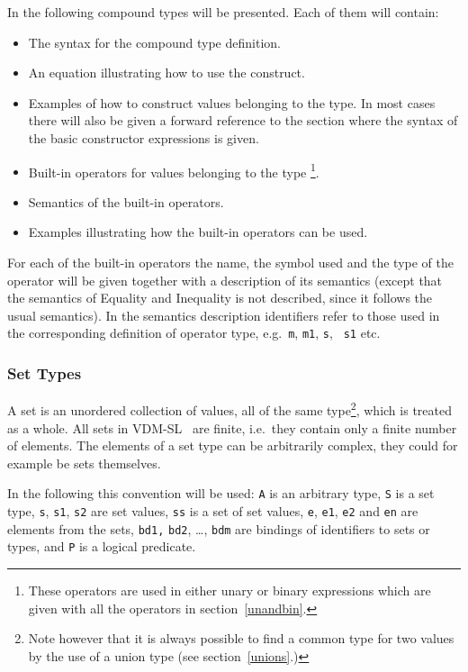 \documentclass[\pformat,12pt]{article}
\newcommand{\vdmslpp}[2]{%
#1
}
\newcommand{\vdmsl}{VDM-SL}
\newcommand{\vdmpp}{VDM++}
\begin{document}
In the following compound types will be presented. Each of
them will contain:
\begin{itemize}
\item The syntax for the compound type definition.
\item An equation illustrating how to use the construct.
\item Examples of how to construct values belonging to the type. In
  most cases there will also be given a forward reference to the
  section where the syntax of the basic constructor expressions is given.
\item Built-in operators for values belonging to the
  type \footnote{These operators are used in either unary or binary
    expressions which are given with all the operators in
    section~\ref{unandbin}.}.
\item Semantics of the built-in operators.
\item Examples illustrating how the built-in operators can be used.
\end{itemize}
For each of the built-in operators the name, the symbol used and the
type of the operator will be given together with a description of its
semantics (except that the semantics of Equality and Inequality is not
described, since it follows the usual semantics). In the semantics
description identifiers refer to those used in the corresponding
definition of operator type, e.g.\ {\tt m}, {\tt m1}, {\tt s}, {\tt
  s1} etc.

\subsubsection{Set Types}
\label{sets}

A set is an unordered collection of values, all of the same
type\footnote{Note however that it is always possible to find a common
  type for two values by the use of a union type (see
  section~\ref{unions}.)}, which is treated as a whole. All sets in 
\vdmslpp{\vdmsl}{\vdmpp}\ are finite, i.e.\ they contain only a finite
number of elements. The elements of a set type can be arbitrarily
complex, they could for example be sets themselves.

In the following this convention will be used: {\tt A} is an arbitrary
type, {\tt S} is a set type, {\tt s}, {\tt s1}, {\tt s2} are set
values, {\tt ss} is a set of set values, {\tt e}, {\tt e1}, {\tt e2}
and {\tt en} are elements from the sets, {\tt bd1,} {\tt bd2}, \ldots,
{\tt bdm} are bindings of identifiers to sets or types, and {\tt P} is
a logical predicate.
\end{document}
